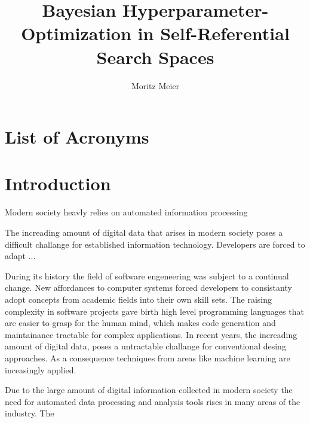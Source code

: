 \documentclass[english]{article}
\begin{document}
\title{Bayesian Hyperparameter-Optimization in Self-Referential Search Spaces}
\author{Moritz Meier}
\maketitle
\tableofcontents
\newpage

\section*{List of Acronyms}
  \begin{acronym}
\end{acronym}

\section{Introduction}

Modern society heavly relies on automated information processing

The increading amount of digital data that arises in modern society poses a difficult challange for established information technology. Developers are forced to adapt  ...

During its history the field of software engeneering was subject to a continual change. New affordances to computer systems forced developers to consistanty adopt concepts from academic fields into their own skill sets. The raising complexity in software projects gave birth high level programming languages that are easier to grasp for the human mind, which makes code generation and maintainance tractable for complex applications.
In recent years, the increading amount of digital data, poses a untractable challange for conventional desing approaches. As a consequence techniques from  areas like machine learning are inceasingly applied.

Due to the large amount of digital information collected in modern society the need for automated data processing and analysis tools rises in many areas of the industry. The
\end{document}
